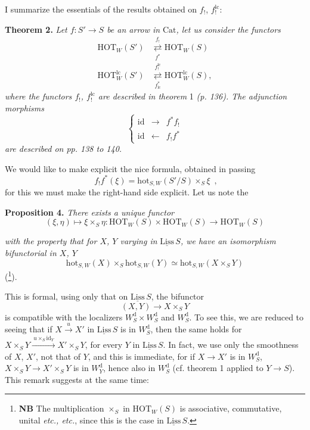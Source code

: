 \documentclass[11pt]{article}
\newcommand{\printedpage}[1]{\marginpar{\footnotesize p.~#1}}
\newcommand{\msp}[1]{\marginpar{\footnotesize [#1]}}
\newcommand{\Cat}{\mathrm{Cat}}
\newcommand{\HOT}{\mathrm{HOT}}
\newcommand{\hot}{\mathrm{hot}}
\newcommand{\id}{\mathrm{id}}
\newcommand{\Liss}{\underline{\mathrm{Liss}}\,}
\newcommand{\dd}{\mathrm{d}}
\newcommand{\lc}{\mathrm{lc}}
\newcommand{\adj}[2]{\mathrel{\underset{#2}{\overset{#1}{\rightleftarrows}}}}
\begin{document}
I summarize the essentials of the results obtained on $f_!$, $f_!^{\lc}$:

\textbf{Theorem 2.} \textit{Let $f : S' \longrightarrow S$ be an arrow in} $\Cat$\textit{, let us consider the functors}
\[
\begin{aligned}
\HOT_W(S') &\adj{f_!}{f^*} \HOT_W(S) \\
\HOT^{\lc}_W(S') &\adj{f_!^{\lc}}{f^*_{\lc}} \HOT^{\lc}_W(S),
\end{aligned}
\]
\msp{page 151}
\textit{where the functors $f_!$, $f_!^{\lc}$ are described in theorem} 1 \textit{(p. 136). The adjunction morphisms}
\[
\left\{
\begin{array}{lcl}
\id & \longrightarrow & f^*f_! \\[1ex]
\id & \longleftarrow & f_!f^*
\end{array}
\right.
\]
\textit{are described on pp. 138 to 140.}

We would like to make explicit the nice formula, obtained in passing
\[
\boxed{\;f_!f^*(\xi) = \hot_{S,W}(S'/S) \times_S \xi\;}\ ,
\]
for this we must make the right-hand side explicit. Let us note the

\textbf{Proposition 4.} \textit{There exists a unique functor}
\[
(\xi, \eta) \longmapsto \xi \times_S \eta : \HOT_W(S) \times \HOT_W(S) \longrightarrow \HOT_W(S)
\]


\printedpage{93}

\textit{with the property that for $X$, $Y$ varying in} $\Liss S$\textit{, we have an isomorphism bifunctorial in $X$, $Y$}
\[
\hot_{S,W}(X) \times_S \hot_{S,W}(Y) \simeq \hot_{S,W}(X \times_S Y)
\tag*{$(*)$}
\]
(\footnote[72]{\textbf{NB} The multiplication $\times_S$ in $\HOT_W(S)$ is associative, commutative, unital \textit{etc., etc.}, since this is the case in $\Liss S$.}).

This is formal, using only that on $\Liss S$, the bifunctor
\[
(X, Y) \longrightarrow X \times_S Y
\]
is compatible with the localizers $W^{\dd}_S \times W^{\dd}_S$ and $W^{\dd}_S$. To see this, we are reduced to seeing that if $X \xrightarrow{u} X'$ in $\Liss S$ is in $W^{\dd}_S$, then the same holds for $X \times_S Y \xrightarrow{\ u\times_S \id_Y\ } X' \times_S Y$, for every
\msp{page 152}
$Y$ in $\Liss S$. In fact, we use only the smoothness of $X$, $X'$, not that of $Y$, and this is immediate, for if $X \longrightarrow X'$ is in $W^{\dd}_S$, $X \times_S Y \longrightarrow X' \times_S Y$ is in $W^{\dd}_Y$, hence also in $W^{\dd}_S$ (cf. theorem 1 applied to $Y \longrightarrow S$). This remark suggests at the same time:
\end{document}
